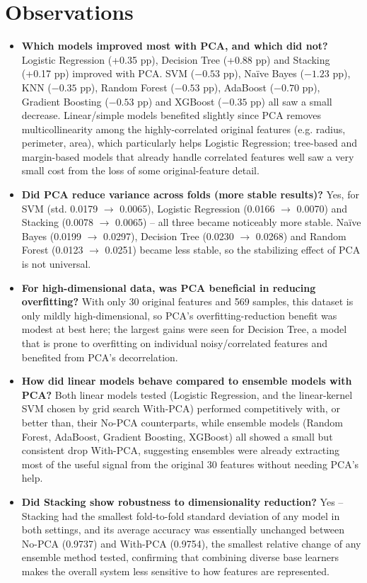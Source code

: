 \documentclass[12pt,a4paper]{article}
\begin{document}
\section{Observations}
\begin{itemize}[leftmargin=*]
    \item \textbf{Which models improved most with PCA, and which did not?} Logistic Regression (+0.35 pp), Decision Tree (+0.88 pp) and Stacking (+0.17 pp) improved with PCA. SVM ($-0.53$ pp), Na\"ive Bayes ($-1.23$ pp), KNN ($-0.35$ pp), Random Forest ($-0.53$ pp), AdaBoost ($-0.70$ pp), Gradient Boosting ($-0.53$ pp) and XGBoost ($-0.35$ pp) all saw a small decrease. Linear/simple models benefited slightly since PCA removes multicollinearity among the highly-correlated original features (e.g. radius, perimeter, area), which particularly helps Logistic Regression; tree-based and margin-based models that already handle correlated features well saw a very small cost from the loss of some original-feature detail.
    \item \textbf{Did PCA reduce variance across folds (more stable results)?} Yes, for SVM (std. 0.0179 $\rightarrow$ 0.0065), Logistic Regression (0.0166 $\rightarrow$ 0.0070) and Stacking (0.0078 $\rightarrow$ 0.0065) -- all three became noticeably more stable. Na\"ive Bayes (0.0199 $\rightarrow$ 0.0297), Decision Tree (0.0230 $\rightarrow$ 0.0268) and Random Forest (0.0123 $\rightarrow$ 0.0251) became less stable, so the stabilizing effect of PCA is not universal.
    \item \textbf{For high-dimensional data, was PCA beneficial in reducing overfitting?} With only 30 original features and 569 samples, this dataset is only mildly high-dimensional, so PCA's overfitting-reduction benefit was modest at best here; the largest gains were seen for Decision Tree, a model that is prone to overfitting on individual noisy/correlated features and benefited from PCA's decorrelation.
    \item \textbf{How did linear models behave compared to ensemble models with PCA?} Both linear models tested (Logistic Regression, and the linear-kernel SVM chosen by grid search With-PCA) performed competitively with, or better than, their No-PCA counterparts, while ensemble models (Random Forest, AdaBoost, Gradient Boosting, XGBoost) all showed a small but consistent drop With-PCA, suggesting ensembles were already extracting most of the useful signal from the original 30 features without needing PCA's help.
    \item \textbf{Did Stacking show robustness to dimensionality reduction?} Yes -- Stacking had the smallest fold-to-fold standard deviation of any model in both settings, and its average accuracy was essentially unchanged between No-PCA (0.9737) and With-PCA (0.9754), the smallest relative change of any ensemble method tested, confirming that combining diverse base learners makes the overall system less sensitive to how features are represented.
\end{itemize}
\end{document}
